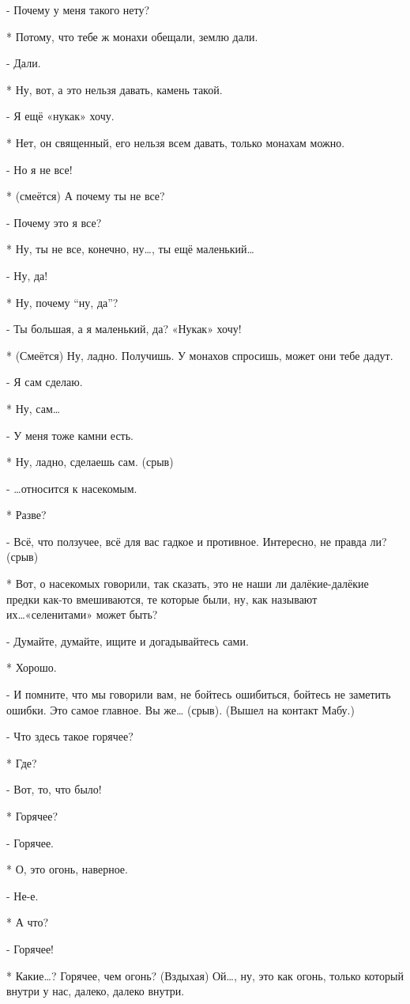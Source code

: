 - Почему у меня такого нету?

* Потому, что тебе ж монахи обещали, землю дали.

- Дали.

* Ну, вот, а это нельзя давать, камень такой.

- Я ещё «нукак» хочу.

* Нет, он священный, его нельзя всем давать, только монахам можно.

- Но я не все!

* (смеётся) А почему ты не все?

- Почему это я все?

* Ну, ты не все, конечно, ну…, ты ещё маленький…

- Ну, да!

* Ну, почему “ну, да”?

- Ты большая, а я маленький, да? «Нукак» хочу!

* (Смеётся) Ну, ладно. Получишь. У монахов спросишь, может они тебе дадут.

- Я сам сделаю.

* Ну, сам…

- У меня тоже камни есть.

* Ну, ладно, сделаешь сам.
 (срыв)

- …относится к насекомым.

* Разве?

- Всё, что ползучее, всё для вас гадкое и противное. Интересно, не правда ли? 
(срыв)

* Вот, о насекомых говорили, так сказать, это не наши ли далёкие-далёкие предки как-то вмешиваются, те которые были, ну, как называют их…«селенитами» может быть?

- Думайте, думайте, ищите и догадывайтесь сами.

* Хорошо.

- И помните, что мы говорили вам, не бойтесь ошибиться, бойтесь не заметить ошибки. Это самое главное. Вы же…
 (срыв).
(Вышел на контакт Мабу.)

- Что здесь такое горячее?

* Где?

- Вот, то, что было!

* Горячее?

- Горячее.

* О, это огонь, наверное.

- Не-е.

* А что?

- Горячее!

* Какие…? Горячее, чем огонь? (Вздыхая) Ой…, ну, это как огонь, только который внутри у нас, далеко, далеко внутри.

